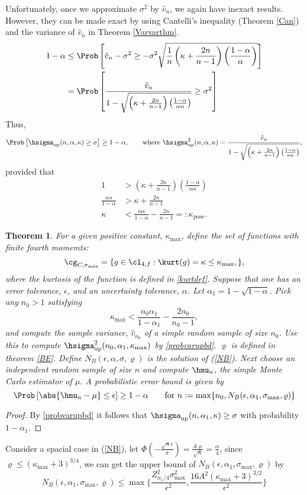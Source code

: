 \documentclass[12pt]{amsart}
\newcommand{\hv}{\hat{v}}
\newtheorem{theorem}{Theorem}
\begin{document}
Unfortunately, once we approximate $\sigma^2$ by $\hv_n$, we again have inexact results.  However, they can be made exact by using Cantelli's inequality (Theorem \ref{Can}) and the variance of $\hv_n$ in Theorem \ref{Varvarthm}.
\begin{align*}
1-\alpha & \le \Prob\left[\hv_n-\sigma^2 \ge - \sigma^2 \sqrt{\frac 1n \left ( \kappa  + \frac{2n}{n-1}\right)\left(\frac{1-\alpha}{\alpha}\right)} \right] \\
&= \Prob\left[\frac{\hv_n}{1 - \sqrt{\left ( \kappa  + \frac{2n}{n-1}\right)\left(\frac{1-\alpha}{\alpha n}\right)}} \ge \sigma^2 \right]
\end{align*}
Thus,
\begin{equation} \label{probvarupbd}
\Prob\left[\hsigma_{\text{up}}(n,\alpha,\kappa)  \ge \sigma \right] \ge 1 - \alpha, \qquad \text{where } \hsigma^2_{\text{up}}(n,\alpha,\kappa) = \frac{\hv_{n}}{1 - \sqrt{ \left ( \kappa  + \frac{2n}{n-1}\right)\left(\frac{1-\alpha}{n \alpha}\right)}},
\end{equation}
provided that
\begin{align*}
1 &> \left ( \kappa  + \frac{2n}{n-1}\right)\left(\frac{1-\alpha}{n \alpha}\right)\\
\frac{n \alpha}{1-\alpha} & > \kappa  + \frac{2n}{n-1} \\
\kappa & < \frac{n \alpha}{1-\alpha} - \frac{2n}{n-1} =: \kappa_{\text{poss}}.
\end{align*}
\begin{theorem} For a given positive constant, $\kappa_{\max}$, define the set of functions with finite fourth momemts:
\[
\cg_{C,\sigma_{\max}}= \{g \in \cl_{4,f} : \kurt(g)= \kappa \le \kappa_{\max}, \},
\]
where the kurtosis of the function is defined in \eqref{kurtdef}.
Suppose that one has an error tolerance, $\epsilon$, and an uncertainty tolerance, $\alpha$. Let $\alpha_1 = 1 - \sqrt{1 - \alpha}$.  Pick any $n_0>1$ satisfying
\[
\kappa_{\max} < \frac{n_0 \alpha_1}{1-\alpha_1} - \frac{2n_0}{n_0-1},
\]
and compute the sample variance, $\hv_{n_0}$ of a simple random sample of size $n_0$.   Use this to compute $\hsigma^2_{\text{\rm up}}(n_0,\alpha_1,\kappa_{\max})$ by \eqref{probvarupbd}.
$\varrho$ is defined in theorem \ref{BE}. Define $N_B(\epsilon,\alpha,\sigma,\varrho)$ is the solution of (\ref{NB}). Next choose an independent random sample of size $n$ and compute $\hmu_n$, the simple Monte Carlo estimator of $\mu$.  A probabilistic error bound is given by
\[
\Prob\left[\abs{\hmu_n-\mu} \le \epsilon \right] \geq 1-\alpha \qquad \text{for } n:=\max\{n_0,N_B(\epsilon,\alpha_1,\sigma_{\max},\varrho)\}
\]
\end{theorem}
\begin{proof}
By \eqref{probvarupbd} it follows that $\hsigma_{\text{up}}(n,\alpha_1,\kappa)  \ge \sigma$ with probability $1-\alpha_1$.
\end{proof}
Consider a spacial case in (\ref{NB}), let $\Phi(-\frac{\sqrt{n}\epsilon}{\sigma})=\frac{A\varrho}{\sqrt{n}}=\frac{\alpha}{4}$, since $\varrho\leq (\kappa_{\max}+3)^{3/4}$,
we can get the upper bound of $N_B(\epsilon,\alpha_1,\sigma_{\max},\varrho)$ by
$$N_B(\epsilon,\alpha_1,\sigma_{\max},\varrho)\leq \max\{\frac{Z^2_{\alpha_1/4}\sigma^2_{\max}}{\epsilon^2},\frac{16A^2(\kappa_{\max}+3)^{3/2}}{\epsilon^2}\}$$
\end{document}
